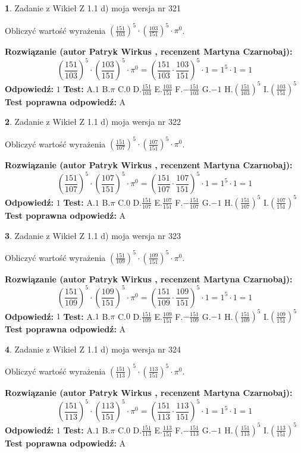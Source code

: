 \documentclass[12pt, a4paper]{article}
\theoremstyle{definition} %
\newtheorem{zad}{}
\newcommand{\zadStart}[1]{\begin{zad}#1\newline}
\newcommand{\zadStop}{\end{zad}}
\newcommand{\rozwStart}[2]{\noindent \textbf{Rozwiązanie (autor #1 , recenzent #2): }\newline}
\newcommand{\rozwStop}{\newline}
\newcommand{\odpStart}{\noindent \textbf{Odpowiedź:}\newline}
\newcommand{\odpStop}{\newline}
\newcommand{\testStart}{\noindent \textbf{Test:}\newline}
\newcommand{\testStop}{\newline}
\newcommand{\kluczStart}{\noindent \textbf{Test poprawna odpowiedź:}\newline}
\newcommand{\kluczStop}{\newline}
\begin{document}
\zadStart{Zadanie z Wikieł Z 1.1 d) moja wersja nr 321}

Obliczyć wartość wyrażenia $(\frac{151}{103})^{5} \cdot (\frac{103}{151})^{5} \cdot \pi^{0}$.
\zadStop
\rozwStart{Patryk Wirkus}{Martyna Czarnobaj}
$$(\frac{151}{103})^{5} \cdot (\frac{103}{151})^{5} \cdot \pi^{0} = (\frac{151}{103} \cdot \frac{103}{151})^{5} \cdot 1 = 1^{5} \cdot 1 = 1$$
\rozwStop
\odpStart
$1$
\odpStop
\testStart
A.$1$ B.$\pi$ C.$0$ D.$\frac{151}{103}$ E.$\frac{103}{151}$
F.$-\frac{151}{103}$ G.$-1$
H.$(\frac{151}{103})^{5}$
I.$(\frac{103}{151})^{5}$
\testStop
\kluczStart
A
\kluczStop



\zadStart{Zadanie z Wikieł Z 1.1 d) moja wersja nr 322}

Obliczyć wartość wyrażenia $(\frac{151}{107})^{5} \cdot (\frac{107}{151})^{5} \cdot \pi^{0}$.
\zadStop
\rozwStart{Patryk Wirkus}{Martyna Czarnobaj}
$$(\frac{151}{107})^{5} \cdot (\frac{107}{151})^{5} \cdot \pi^{0} = (\frac{151}{107} \cdot \frac{107}{151})^{5} \cdot 1 = 1^{5} \cdot 1 = 1$$
\rozwStop
\odpStart
$1$
\odpStop
\testStart
A.$1$ B.$\pi$ C.$0$ D.$\frac{151}{107}$ E.$\frac{107}{151}$
F.$-\frac{151}{107}$ G.$-1$
H.$(\frac{151}{107})^{5}$
I.$(\frac{107}{151})^{5}$
\testStop
\kluczStart
A
\kluczStop



\zadStart{Zadanie z Wikieł Z 1.1 d) moja wersja nr 323}

Obliczyć wartość wyrażenia $(\frac{151}{109})^{5} \cdot (\frac{109}{151})^{5} \cdot \pi^{0}$.
\zadStop
\rozwStart{Patryk Wirkus}{Martyna Czarnobaj}
$$(\frac{151}{109})^{5} \cdot (\frac{109}{151})^{5} \cdot \pi^{0} = (\frac{151}{109} \cdot \frac{109}{151})^{5} \cdot 1 = 1^{5} \cdot 1 = 1$$
\rozwStop
\odpStart
$1$
\odpStop
\testStart
A.$1$ B.$\pi$ C.$0$ D.$\frac{151}{109}$ E.$\frac{109}{151}$
F.$-\frac{151}{109}$ G.$-1$
H.$(\frac{151}{109})^{5}$
I.$(\frac{109}{151})^{5}$
\testStop
\kluczStart
A
\kluczStop



\zadStart{Zadanie z Wikieł Z 1.1 d) moja wersja nr 324}

Obliczyć wartość wyrażenia $(\frac{151}{113})^{5} \cdot (\frac{113}{151})^{5} \cdot \pi^{0}$.
\zadStop
\rozwStart{Patryk Wirkus}{Martyna Czarnobaj}
$$(\frac{151}{113})^{5} \cdot (\frac{113}{151})^{5} \cdot \pi^{0} = (\frac{151}{113} \cdot \frac{113}{151})^{5} \cdot 1 = 1^{5} \cdot 1 = 1$$
\rozwStop
\odpStart
$1$
\odpStop
\testStart
A.$1$ B.$\pi$ C.$0$ D.$\frac{151}{113}$ E.$\frac{113}{151}$
F.$-\frac{151}{113}$ G.$-1$
H.$(\frac{151}{113})^{5}$
I.$(\frac{113}{151})^{5}$
\testStop
\kluczStart
A
\kluczStop
\end{document}
